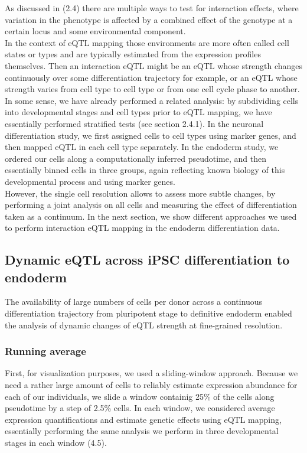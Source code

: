 As discussed in (2.4) there are multiple ways to test for interaction effects, where variation in the phenotype is affected by a combined effect of the genotype at a certain locus and some environmental component.\\

In the context of eQTL mapping those environments are more often called cell states or types and are typically estimated from the expression profiles themselves. 
Then an interaction eQTL might be an eQTL whose strength changes continuously over some differentiation trajectory for example, or an eQTL whose strength varies from cell type to cell type or from one cell cycle phase to another.\\ 

In some sense, we have already performed a related analysis: by subdividing cells into developmental stages and cell types prior to eQTL mapping, we have essentially performed stratified tests (see section 2.4.1).
In the neuronal differentiation study, we first assigned cells to cell types using marker genes, and then mapped eQTL in each cell type separately.
In the endoderm study, we ordered our cells along a computationally inferred pseudotime, and then essentially binned cells in three groups, again reflecting known biology of this developmental process and using marker genes.\\

However, the single cell resolution allows to assess more subtle changes, by performing a joint analysis on all cells and measuring the effect of differentiation taken as a continuum.
In the next section, we show different approaches we used to perform interaction eQTL mapping in the endoderm differentiation data.

\subsection{Dynamic eQTL across iPSC differentiation to endoderm}

The availability of large numbers of cells per donor across a continuous differentiation trajectory from pluripotent stage to definitive endoderm enabled the analysis of dynamic changes of eQTL strength at fine-grained resolution. 

\subsubsection{Running average}

First, for visualization purposes, we used a sliding-window approach. 
Because we need a rather large amount of cells to reliably estimate expression abundance for each of our individuals, we slide a window containig 25\% of the cells along pseudotime by a step of 2.5\% cells.
In each window, we considered average expression quantifications and estimate genetic effects using eQTL mapping, essentially performing the same analysis we perform in three developmental stages in each window (4.5). 

